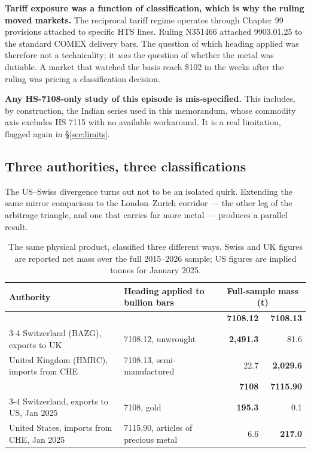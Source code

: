 \documentclass[11pt,a4paper]{article}
\begin{document}
\textbf{Tariff exposure was a function of classification, which is why the ruling moved
markets.} The reciprocal tariff regime operates through Chapter 99 provisions attached to
specific HTS lines. Ruling N351466 attached 9903.01.25 to the standard COMEX delivery bars.
The question of which heading applied was therefore not a technicality; it \emph{was} the
question of whether the metal was dutiable. A market that watched the basis reach \$102 in the
weeks after the ruling was pricing a classification decision.

\textbf{Any HS-7108-only study of this episode is mis-specified.} This includes, by
construction, the Indian series used in this memorandum, whose commodity axis excludes HS 7115
with no available workaround. It is a real limitation, flagged again in \S\ref{sec:limits}.

\subsection{Three authorities, three classifications}

The US--Swiss divergence turns out not to be an isolated quirk. Extending the same mirror
comparison to the London--Zurich corridor --- the other leg of the arbitrage triangle, and one
that carries far more metal --- produces a parallel result.

\begin{table}[h]
\centering
\begin{tabular}{@{}lp{5.0cm}rr@{}}
\toprule
\textbf{Authority} & \textbf{Heading applied to bullion bars} & \multicolumn{2}{c}{\textbf{Full-sample mass (t)}} \\
\midrule
& & \textbf{7108.12} & \textbf{7108.13} \\
\cmidrule(l){3-4}
Switzerland (BAZG), exports to UK & 7108.12, unwrought & \textbf{2{,}491.3} & 81.6 \\
United Kingdom (HMRC), imports from CHE & 7108.13, semi-manufactured & 22.7 & \textbf{2{,}029.6} \\
\midrule
& & \textbf{7108} & \textbf{7115.90} \\
\cmidrule(l){3-4}
Switzerland, exports to US, Jan 2025 & 7108, gold & \textbf{195.3} & 0.1 \\
United States, imports from CHE, Jan 2025 & 7115.90, articles of precious metal &
6.6 & \textbf{217.0} \\
\bottomrule
\end{tabular}
\caption{The same physical product, classified three different ways. Swiss and UK figures are
reported net mass over the full 2015--2026 sample; US figures are implied tonnes for January
2025.}
\end{table}
\end{document}
